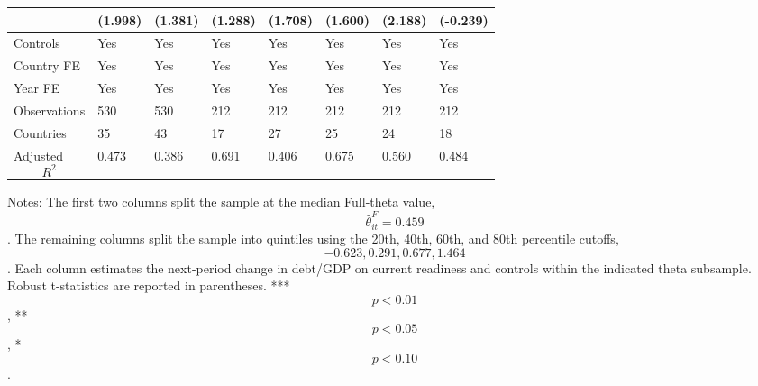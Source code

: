 \begin{table}[H]
\begin{threeparttable}
\begin{tabularx}{\textwidth}{lYYYYYYY}
  & (1.998) & (1.381) & (1.288) & (1.708) & (1.600) & (2.188) & (-0.239) \\
\midrule
Controls & Yes & Yes & Yes & Yes & Yes & Yes & Yes \\
Country FE & Yes & Yes & Yes & Yes & Yes & Yes & Yes \\
Year FE & Yes & Yes & Yes & Yes & Yes & Yes & Yes \\
Observations & 530 & 530 & 212 & 212 & 212 & 212 & 212 \\
Countries & 35 & 43 & 17 & 27 & 25 & 24 & 18 \\
Adjusted $$R^2$$ & 0.473 & 0.386 & 0.691 & 0.406 & 0.675 & 0.560 & 0.484 \\
\bottomrule
\end{tabularx}
\begin{tablenotes}[flushleft]\footnotesize
\item Notes: The first two columns split the sample at the median Full-theta value, $$\widehat{\theta}^{F}_{it}=0.459$$. The remaining columns split the sample into quintiles using the 20th, 40th, 60th, and 80th percentile cutoffs, $$-0.623, 0.291, 0.677, 1.464$$. Each column estimates the next-period change in debt/GDP on current readiness and controls within the indicated theta subsample. Robust t-statistics are reported in parentheses. *** $$p<0.01$$, ** $$p<0.05$$, * $$p<0.10$$.
\end{tablenotes}
\end{threeparttable}
\end{table}
